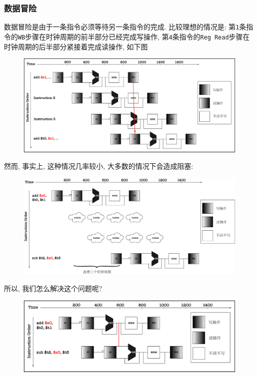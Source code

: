 \subsubsection{数据冒险}
数据冒险是由于一条指令必须等待另一条指令的完成. 比较理想的情况是: 第\verb|1|条指令的\verb|WB|步骤在时钟周期的前半部分已经完成写操作, 第\verb|4|条指令的\verb|Reg Read|步骤在时钟周期的后半部分紧接着完成读操作, 如下图
\begin{figure}[H]
\centering
\includegraphics[scale=.4]{img/figure41.pdf}
\end{figure}
然而, 事实上, 这种情况几率较小, 大多数的情况下会造成阻塞:
\begin{figure}[H]
\centering
\includegraphics[scale=.4]{img/figure42.pdf}
\end{figure}
所以, 我们怎么解决这个问题呢?
\begin{figure}[H]
\centering
\includegraphics[scale=.4]{img/figure43.pdf}
\end{figure}
